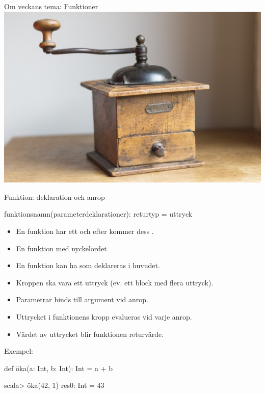 \begin{SlideExtra}{Om veckans tema: Funktioner}
  \includegraphics[width=1.0\textwidth]{../img/coffee-grinder}
\end{SlideExtra}
\fi


\begin{Slide}{Funktion: deklaration och anrop}
\SlideOnly{\setlength{\leftmargini}{0pt}}

 funktionsnamn(parameterdeklarationer): returtyp = uttryck
\vspace{0.5em}


\begin{itemize}\SlideFontSmall
  \item En funktion har ett  och efter \code{=} kommer dess .
  \item En  funktion  med nyckelordet 
  \item En funktion kan ha  som deklareras i huvudet. 
  \item Kroppen ska vara ett uttryck (ev. ett block med flera uttryck).
  \item Parametrar binds till argument vid anrop.
  \item Uttrycket i funktionens kropp evalueras vid varje anrop. 
  \item Värdet av uttrycket blir funktionen returvärde. 
\end{itemize}




\pause
Exempel:
\begin{Code}
def öka(a: Int, b: Int): Int = a + b
\end{Code}
\pause
\begin{REPLnonum}
scala> öka(42, 1)
res0: Int = 43
\end{REPLnonum}


\end{Slide}


